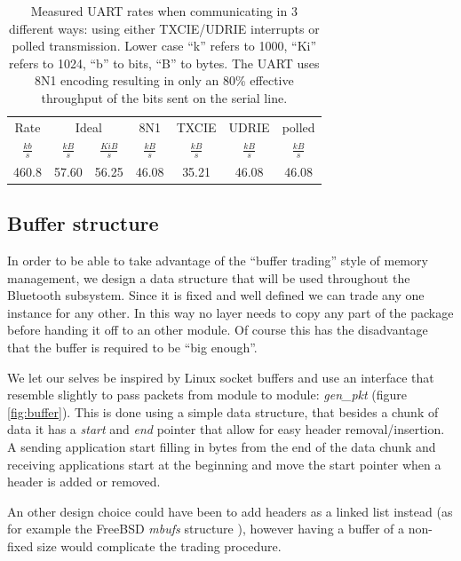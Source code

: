 \documentclass[a4paper,10pt]{article}
\begin{document}
\begin{table}[tbp]
  \begin{center}
    \begin{tabular}{|c|c|c|c|c|c|c|}
      \hline
      Rate & \multicolumn{2}{c|}{Ideal} & 8N1 & TXCIE & UDRIE & polled\\
      $\frac{kb}{s}$ & $\frac{kB}{s}$ & $\frac{KiB}{s}$ &$\frac{kB}{s}$ &$\frac{kB}{s}$  &$\frac{kB}{s}$ &$\frac{kB}{s}$ \\
      \hline
      460.8 &  57.60  & 56.25 & 46.08 &  35.21 &   46.08 &  46.08\\
      \hline
    \end{tabular}
    \caption{Measured UART rates when communicating in 3 different
      ways: using either \mbox{TXCIE}/UDRIE interrupts or polled
      transmission.  Lower case ``k'' refers to 1000, ``Ki'' refers to
      1024, ``b'' to bits, ``B'' to bytes. The UART uses 8N1 encoding
      resulting in only an 80\% effective throughput of the bits sent
      on the serial line.}
    \label{tab:uart}
  \end{center}
\end{table}

\subsection{Buffer structure}
\label{bufferstructure}
In order to be able to take advantage of the ``buffer trading'' style
of memory management, we design a data structure that will be used
throughout the Bluetooth subsystem. Since it is fixed and well defined
we can trade any one instance for any other. In this way no layer needs
to copy any part of the package before handing it off to an other
module. Of course this has the disadvantage that the buffer is
required to be ``big enough''.

We let our selves be inspired by Linux socket buffers \cite{TLK} and
use an interface that resemble slightly to pass packets from module to
module: \emph{gen\_pkt} (figure \ref{fig:buffer}). This is done using
a simple data structure, that besides a chunk of data it has a
\emph{start} and \emph{end} pointer that allow for easy header
removal/insertion. A sending application start filling in bytes from
the end of the data chunk and receiving applications start at the
beginning and move the start pointer when a header is added or
removed.

An other design choice could have been to add headers as a linked list
instead (as for example the FreeBSD \emph{mbufs} structure
\cite{LMKQ90}), however having a buffer of a non-fixed size would
complicate the trading procedure.
\end{document}

